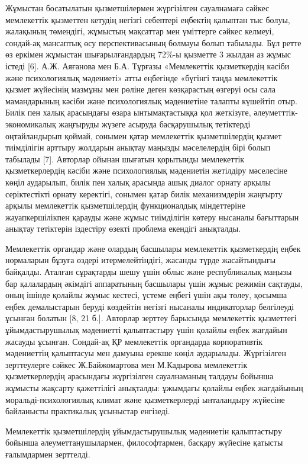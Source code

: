 \begin{multicols}{2}
Жұмыстан босатылатын қызметшілермен жүргізілген сауалнамаға сәйкес
мемлекеттік қызметтен кетудің негізгі себептері еңбектің қалыптан тыс
болуы, жалақының төмендігі, жұмыстың мақсаттар мен үміттерге сәйкес
келмеуі, сондай-ақ мансаптық өсу перспективасының болмауы болып
табылады. Бұл ретте өз еркімен жұмыстан шығарылғандардың 72\%-ы қызметте
3 жылдан аз жұмыс істеді {[}6{]}. А.Ж. Аяғанова мен Б.А. Тұрғазы
«Мемлекеттік қызметкердің кәсіби және психологиялық мәдениеті» атты
еңбегінде «бүгінгі таңда мемлекеттік қызмет жүйесінің мазмұны мен рөліне
деген көзқарастың өзгеруі осы сала мамандарының кәсіби және
психологиялық мәдениетіне талапты күшейтіп отыр. Билік пен халық
арасындағы өзара ынтымақтастыққа қол жеткізуге, әлеуметттік-экономикалық
жаңғыруды жүзеге асыруда басқарушылық тетіктерді оңтайландырып қоймай,
сонымен қатар мемлекеттік қызметшілердің қызмет тиімділігін арттыру
жолдарын анықтау маңызды мәселелердің бірі болып табылады {[}7{]}.
Авторлар ойынан шығатын қорытынды мемлекеттік қызметкерлердің кәсіби
және психологиялық мәдениетін жетілдіру мәселесіне көңіл аударылып,
билік пен халық арасында ашық диалог орнату арқылы серіктестікті орнату
керектігі, сонымен қатар билік механизмдерін жаңғырту арқылы мемлекеттік
қызметшілердің функционалдық міндеттеріне жауапкершілікпен қарауды және
жұмыс тиімділігін көтеру нысаналы бағыттарын анықтау тетіктерін
іздестіру өзекті проблема екендігі анықталды.

Мемлекеттік органдар және олардың басшылары мемлекеттік қызметкердің
еңбек нормаларын бұзуға өздері итермелейтіндігі, жасанды түрде
жасайтындығы байқалды. Аталған сұрақтарды шешу үшін облыс және
республикалық маңызы бар қалалардың әкімдігі аппаратының басшылары үшін
жұмыс режимін сақтауды, оның ішінде қолайлы жұмыс кестесі, үстеме еңбегі
үшін ақы төлеу, қосымша еңбек демалыстарын беруді көздейтін негізгі
нысаналы индикаторлар белгілеуді ұсынған болатын {[}8, 21 б.{]}.
Авторлар зерттеу барысында мемлекеттік қызметтегі ұйымдастырушылық
мәдениетті қалыптастыру үшін қолайлы еңбек жағдайын жасауды ұсынған.
Сондай-ақ ҚР мемлекеттік органдарда корпоративтік мәдениеттің қалыптасуы
мен дамуына ерекше көңіл аударылады. Жүргізілген зерттеулерге сәйкес
Ж.Байжомартова мен М.Кадырова мемлекеттік қызметкерлердің арасындағы
жүргізілген сауалнаманың талдауы бойынша жұмысты жақсарту қажеттілігі
анықталды: ұжымдағы қолайлы еңбек жағдайының моральді-психологиялық
климат және қызметкерлерді ынталандыру жүйесіне байланысты практикалық
ұсыныстар енгізеді.

Мемлекеттік қызметшілердің ұйымдастырушылық мәдениетін қалыптастыру
бойынша әлеуметтанушылармен, философтармен, басқару жүйесіне қатысты
ғалымдармен зерттелді.


\end{multicols}
